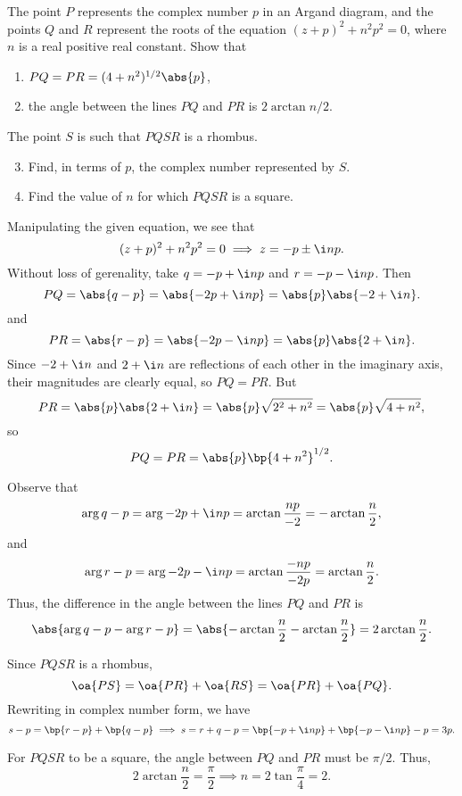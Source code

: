 \begin{problem}
    The point $P$ represents the complex number $p$ in an Argand diagram, and the points $Q$ and $R$ represent the roots of the equation $(z + p)^2 + n^2 p^2 = 0$, where $n$ is a real positive real constant. Show that
    \begin{enumerate}
        \item $PQ = PR = (4 + n^2)^{1/2} \abs{p}$,
        \item the angle between the lines $PQ$ and $PR$ is $2\arctan{n/2}$.
    \end{enumerate}

    The point $S$ is such that $PQSR$ is a rhombus.
    \begin{enumerate}
        \setcounter{enumi}{2}
        \item Find, in terms of $p$, the complex number represented by $S$.
        \item Find the value of $n$ for which $PQSR$ is a square.
    \end{enumerate}
\end{problem}
\begin{solution}
    \begin{ppart}
        Manipulating the given equation, we see that \[(z + p)^2 + n^2 p^2 = 0 \implies z = - p \pm \i n p.\] Without loss of gerenality, take $q = -p + \i n p$ and $r = -p - \i n p$. Then \[PQ = \abs{q - p} = \abs{-2p + \i np} = \abs{p} \abs{-2 + \i n}.\] and \[PR = \abs{r - p} = \abs{-2p - \i n p} = \abs{p} \abs{2 + \i n}.\] Since $-2 + \i n$ and $2 + \i n$ are reflections of each other in the imaginary axis, their magnitudes are clearly equal, so $PQ = PR$. But \[PR = \abs{p} \abs{2 + \i n} = \abs{p} \sqrt{2^2 + n^2} = \abs{p} \sqrt{4 + n^2},\] so \[PQ = PR = \abs{p} \bp{4 + n^2}^{1/2}.\]
    \end{ppart}
    \begin{ppart}
        Observe that \[\arg{q - p} = \arg{-2p + \i n p} = \arctan{\frac{np}{-2}} = - \arctan{\frac{n}{2}},\] and \[\arg{r - p} = \arg{-2p - \i n p} = \arctan{\frac{-np}{-2p}} = \arctan{\frac{n}{2}}.\] Thus, the difference in the angle between the lines $PQ$ and $PR$ is \[\abs{\arg{q-p} - \arg{r-p}} = \abs{- \arctan{\frac{n}{2}} - \arctan{\frac{n}{2}}} = 2\arctan{\frac{n}{2}}.\]
    \end{ppart}
    \begin{ppart}
        Since $PQSR$ is a rhombus, \[\oa{PS} = \oa{PR} + \oa{RS} = \oa{PR} + \oa{PQ}.\] Rewriting in complex number form, we have \[s - p = \bp{r - p} + \bp{q - p} \implies s = r + q - p = \bp{-p + \i n p} + \bp{-p - \i n p} - p = 3p.\]
    \end{ppart}
    \begin{ppart}
        For $PQSR$ to be a square, the angle between $PQ$ and $PR$ must be $\pi/2$. Thus, \[2\arctan{\frac{n}{2}} = \frac\pi2 \implies n = 2\tan{\frac{\pi}{4}} = 2.\]
    \end{ppart}
\end{solution}

